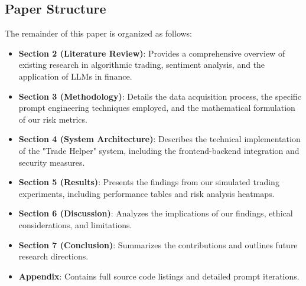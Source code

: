 \subsection{Paper Structure}
The remainder of this paper is organized as follows:
\begin{itemize}
    \item \textbf{Section 2 (Literature Review)}: Provides a comprehensive overview of existing research in algorithmic trading, sentiment analysis, and the application of LLMs in finance.
    \item \textbf{Section 3 (Methodology)}: Details the data acquisition process, the specific prompt engineering techniques employed, and the mathematical formulation of our risk metrics.
    \item \textbf{Section 4 (System Architecture)}: Describes the technical implementation of the "Trade Helper" system, including the frontend-backend integration and security measures.
    \item \textbf{Section 5 (Results)}: Presents the findings from our simulated trading experiments, including performance tables and risk analysis heatmaps.
    \item \textbf{Section 6 (Discussion)}: Analyzes the implications of our findings, ethical considerations, and limitations.
    \item \textbf{Section 7 (Conclusion)}: Summarizes the contributions and outlines future research directions.
    \item \textbf{Appendix}: Contains full source code listings and detailed prompt iterations.
\end{itemize}
